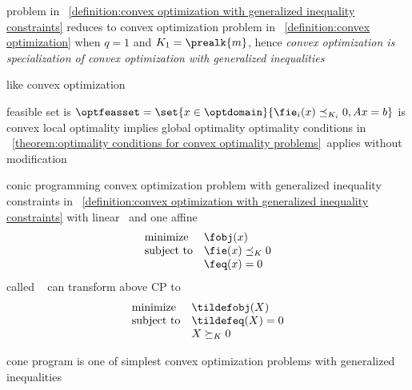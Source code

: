 \documentclass[17pt,landscape]{foils}
\begin{document}
{\shrinkspacewithintheoremslike
\bit
\item
	problem in ~\ref{definition:convex optimization with generalized inequality constraints}
	reduces to convex optimization problem in ~\ref{definition:convex optimization}
	when $q=1$ and $K_1=\prealk{m}$,
	hence \emph{convex optimization is specialization of convex optimization with generalized inequalities}
\item
	like convex optimization
	\bit
	\item
		feasible set is $\optfeasset = \set{x\in\optdomain}{\fie_i(x)\preceq_{K_i} 0, Ax=b}$ is convex
	\vitem
		local optimality implies global optimality
	\vitem
		optimality conditions in
		\theoremname~\ref{theorem:optimality conditions for convex optimality problems}\
		applies without modification
	\eit
\eit
\vfill



\begin{mydefinition}{conic programming}
	convex optimization problem with generalized inequality constraints
	in \definitionname~\ref{definition:convex optimization with generalized inequality constraints}
	with linear \fobj\ and one affine \fie\
	$$
		\begin{array}{ll}
			\mbox{minimize}
				& \fobj(x)
			\\
			\mbox{subject to}
				& \fie(x) \preceq_{K} 0
			\\
				& \feq(x) = 0
		\end{array}
	$$
	called 
	\shrinkspacewithintheoremslike\
	\ibit
	\iitem
		can transform above CP to \
		$$
			\begin{array}{ll}
				\mbox{minimize}
					& \tildefobj(X)
				\\
				\mbox{subject to}
					& \tildefeq (X) = 0
				\\
					& X \succeq_{K} 0
			\end{array}
		$$
	\eit
\end{mydefinition}


\bit
\item
	cone program is one of simplest convex optimization problems
	with generalized inequalities
\eit



}
\end{document}
